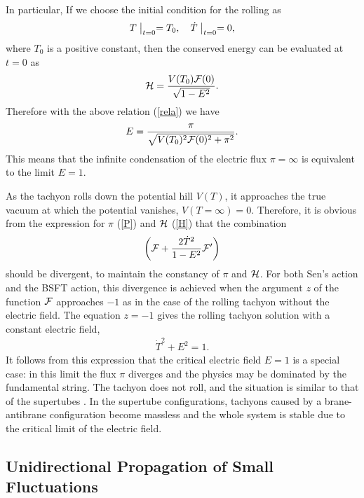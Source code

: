 \documentclass[a4paper,12pt]{article}
\begin{document}
In particular, If we choose the initial
condition for the rolling as
\begin{eqnarray}
  T\bigm|_{t=0}=T_0, \quad \dot{T}\bigm|_{t=0}=0,
\end{eqnarray}
where $T_0$ is a positive constant, 
then the conserved energy can be evaluated at $t=0$ as
\begin{eqnarray}
  {\cal H} = \frac{V(T_0){\cal F}(0)}{\sqrt{1-E^2}}.
\end{eqnarray}
Therefore with the above relation (\ref{rela})
we have
\begin{eqnarray}
  E = \frac{\pi}{\sqrt{V(T_0)^2 {\cal F}(0)^2+\pi^2}}.
\end{eqnarray}
This means that the infinite condensation of the electric flux
$\pi=\infty$ is equivalent to  the limit $E=1$. 

As the tachyon rolls down the potential hill $V(T)$, it approaches the
true vacuum at which the potential vanishes, $V(T\!=\!\infty)=0$.
Therefore, it is obvious from the expression for $\pi$ 
(\ref{P}) and ${\cal H}$ (\ref{H}) that the combination 
\begin{eqnarray}
\left({\cal F}+ \frac{2\dot{T}^2}{1-E^2}
{\cal F}'\right)
\label{combif}
\end{eqnarray}
should be divergent, to maintain the constancy of  $\pi$ and ${\cal H}$.
For both Sen's action and the BSFT action, this divergence is
achieved when the argument $z$ of the function ${\cal F}$ approaches
$-1$ as in the case of the rolling tachyon without the electric field. 
The equation $z=-1$ gives the rolling tachyon solution with a constant
electric field, 
\begin{eqnarray}
  \dot{T}^2+E^2 = 1.
\label{conse}
\end{eqnarray}
It follows from this expression that the critical electric field $E=1$
is a special case: in this limit the flux $\pi$ diverges and the physics 
may be dominated by the fundamental string. The tachyon does not roll,
and the situation is similar to that of the supertubes \cite{supertube}.  
In the supertube configurations, tachyons caused by a brane-antibrane
configuration become massless and the whole system is
stable due to the critical limit of the electric field. 

\subsection{Unidirectional Propagation of Small Fluctuations}
\label{sena}
\end{document}
